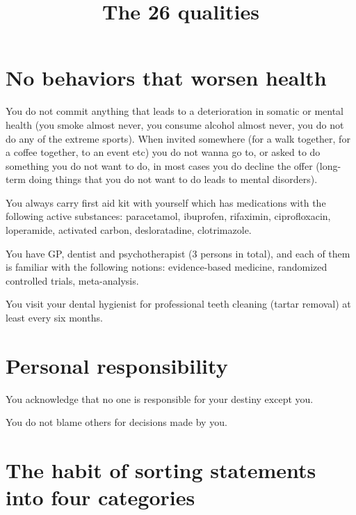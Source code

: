 \documentclass[11pt]{article}
\theoremstyle{remark}
\theoremstyle{definition}
\begin{document}
\baselineskip14pt
\bigskip





\title{The 26 qualities}




\maketitle






\section{No behaviors that worsen health}



You do not commit anything that leads to a deterioration in somatic or mental health (you smoke almost never, you consume alcohol almost never, you do not do any of the extreme sports). When invited somewhere (for a walk together, for a coffee together, to an event etc) you do not wanna go to, or asked to do something you do not want to do, in most cases you do decline the offer (long-term doing things that you do not want to do leads to mental disorders).

You always carry first aid kit with yourself which has medications with the following active substances: paracetamol, ibuprofen, rifaximin, ciprofloxacin, loperamide, activated carbon, desloratadine, clotrimazole.

You have GP, dentist and psychotherapist (3 persons in total), and each of them is familiar with the following notions: evidence-based medicine, randomized controlled trials, meta-analysis.

You visit your dental hygienist for professional teeth cleaning (tartar removal) at least every six months.




\section{Personal responsibility}



You acknowledge that no one is responsible for your destiny except you. 

You do not blame others for decisions made by you.



\section{The habit of sorting statements into four categories}
\end{document}
